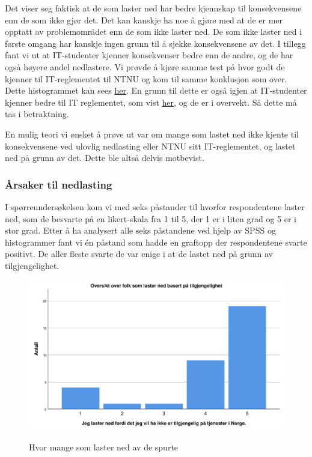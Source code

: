 Det viser seg faktisk at de som laster ned har bedre kjennskap til konsekvensene enn de som ikke gjør det. Det kan kanskje ha noe å gjøre med at de er mer opptatt av problemområdet enn de som ikke laster ned. De som ikke laster ned i første omgang har kanskje ingen grunn til å sjekke konsekvensene av det. I tillegg fant vi ut at IT-studenter kjenner konsekvenser bedre enn de andre, og de har også høyere andel nedlastere. Vi prøvde å kjøre samme test på hvor godt de kjenner til IT-reglementet til NTNU \cite{ITReg} og kom til samme konklusjon som over. Dette histogrammet kan sees \hyperref[fig:reglement-lasterned]{her}. En grunn til dette er også igjen at IT-studenter kjenner bedre til IT reglementet, som vist \hyperref[fig:reglement-fakultet]{her}, og de er i overvekt. Så dette må tas i betraktning. 

En mulig teori vi ønsket å prøve ut var om mange som lastet ned ikke kjente til konsekvensene ved ulovlig nedlasting eller NTNU sitt IT-reglementet, og lastet ned på grunn av det. Dette ble altså delvis motbevist.

\subsubsection{Årsaker til nedlasting}
I spørreundersøkelsen kom vi med seks påstander til hvorfor respondentene laster ned, som de besvarte på en likert-skala fra 1 til 5, der 1 er i liten grad og 5 er i stor grad. Etter å ha analysert alle seks påstandene ved hjelp av SPSS og histogrammer fant vi én påstand som hadde en graftopp der respondentene svarte positivt. De aller fleste svarte de var enige i at de lastet ned på grunn av tilgjengelighet.

\begin{figure}[H]
    \centering
    \includegraphics[scale=0.45]{case_1/bilder/tilgjengelighet.pdf}
    \label{fig:tilgjengelighet}
    \caption[Tilgjengelighet]{Hvor mange som laster ned av de spurte}
\end{figure}

